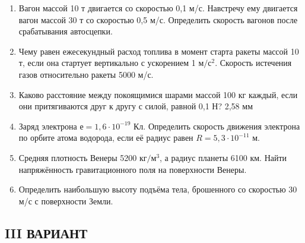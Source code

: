 \documentclass[a5paper, 10pt]{diss_4}
\renewcommand{\'}{\,'}
\begin{document}
\begin{enumerate}

\item Вагон  массой 10 т  двигается  со  скоростью  0,1 м/с.  Навстречу ему  двигается вагон массой 30 т  со скоростью 0,5 м/с. Определить скорость вагонов после срабатывания автосцепки.

\item Чему равен ежесекундный расход топлива в момент старта ракеты массой 10 т, если она стартует вертикально с ускорением 1 $м/с^2$. Скорость истечения газов относительно ракеты 5000 м/с.

\item Каково расстояние между покоящимися шарами массой 100 кг каждый, если они притягиваются друг к другу с силой, равной 0,1 Н? 2,58 мм

\item Заряд электрона $е = 1,6\cdot10^{-19}$ Кл. Определить скорость движения электрона по орбите атома водорода, если её радиус равен $R=5,3\cdot10^{-11}$ м.

\item Средняя плотность Венеры 5200 $кг/м^3$, а радиус планеты 6100 км. Найти напряжённость гравитационного поля на поверхности Венеры.

\item Определить наибольшую высоту подъёма тела, брошенного со скоростью 30 м/с с поверхности Земли.

\end{enumerate}

\subsection{III ВАРИАНТ}
\end{document}
